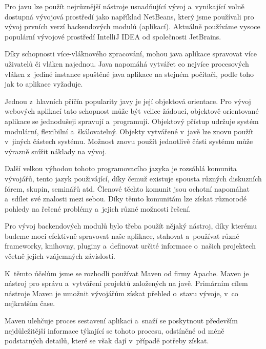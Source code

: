 \documentclass[twoside, 12pt]{article}
\begin{document}
{%
Pro javu lze použít nejrůznější nástroje usnadňující vývoj a~vynikající volně dostupná vývojová prostředí
jako například NetBeans, který jsme používali pro vývoj prvních verzí backendových modulů
(aplikací).
Aktuálně používáme vysoce populární vývojové prostředí IntelliJ IDEA
od společnosti JetBrains.

Díky schopnosti více-vláknového zpracování,
mohou java aplikace spravovat více uživatelů či vláken najednou.
Java napomáhá vytvářet co nejvíce procesových vláken z~jediné instance
spuštěné java aplikace na stejném počítači, podle toho jak to aplikace vyžaduje.


Jednou z~hlavních příčín popularity javy je její objektová orientace.
Pro vývoj webových aplikací tato schopnost může být velice žádoucí,
objektově orientované aplikace se jednodušeji spravují a~programují.
Objektový přístup udržuje systém modulární, flexibilní a~škálovatelný.
Objekty vytvářené v~javě lze znovu použít v~jiných částech systému.
Možnost znovu použít jednotlivě části systému může výrazně snížit náklady na vývoj.

Další velkou výhodou tohoto programovacího jazyka je rozsáhlá komunita vývojářů,
tento jazyk použivájící, díky čemuž existuje spousta různých diskuzních fórem,
skupin, seminářů atd. Členové těchto komunit
jsou ochotní napomáhat a~sdílet své znalosti mezi sebou.
Díky těmto komunitám lze získat různorodé pohledy na řešené problémy
a~jejich různé možnosti řešení.
\cite{xicom}


Pro vývoj backendových modulů bylo třeba použít nějaký nástroj,
díky kterému budeme moci efektivně spravovat naše aplikace,
stahovat a~používat různé frameworky, knihovny, pluginy
a~definovat určité informace o~našich projektech včetně jejich vzájemných závislostí.

K~těmto účelům jsme se rozhodli používat Maven od firmy Apache.
Maven je nástroj pro správu a~vytváření projektů založených na javě.
Primárním cílem nástroje Maven je umožnit vývojářům získat přehled o~stavu
vývoje, v~co nejkratším čase.

Maven ulehčuje proces sestavení aplikací a~snaží se poskytnout především
nejdůležitější informace týkající se tohoto procesu,
odstíněné od méně podstatných detailů,
které se však dají v~případě potřeby získat.

}
\end{document}
